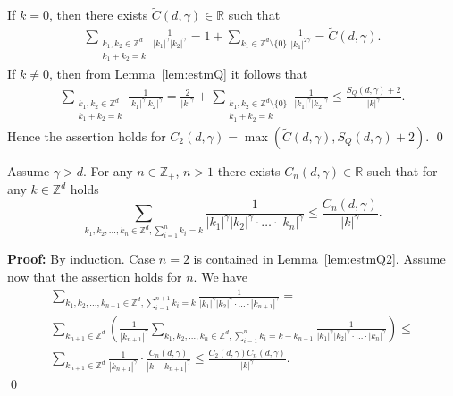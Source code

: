 If $k=0$, then there exists $\widetilde{C}(d,\gamma) \in
\mathbb{R}$ such that
\begin{eqnarray*}
  \sum_{\substack{k_1,k_2 \in \mathbb{Z}^d\\ k_1+k_2=k}} \frac{1}{|k_1|^\gamma |k_2|^\gamma} =
  1 + \sum_{k_1 \in  \mathbb{Z}^d\setminus \{0\}}
  \frac{1}{|k_1|^{2\gamma}} =\widetilde{C}(d,\gamma).
\end{eqnarray*}
If $k \neq 0$, then from Lemma~\ref{lem:estmQ} it follows that
\begin{eqnarray*}
 \sum_{\substack{k_1,k_2 \in \mathbb{Z}^d\\ k_1+k_2=k}} \frac{1}{|k_1|^\gamma
 |k_2|^\gamma}= \frac{2}{|k|^\gamma} +
 \sum_{\substack{k_1,k_2 \in \mathbb{Z}^d \setminus \{0\}\\ k_1+k_2=k}} \frac{1}{|k_1|^\gamma |k_2|^\gamma}
    \leq
    \frac{S_Q(d,\gamma) +   2}{|k|^\gamma}.
\end{eqnarray*}
Hence the assertion holds for
$C_2(d,\gamma)=\max(\widetilde{C}(d,\gamma),S_Q(d,\gamma) + 2 )$.
\qed

\begin{lemma} \cite[Lemma 3.5]{ZKS3}
\label{lem:estmQn} Assume $\gamma > d$. For any $n \in
\mathbb{Z}_+$, $n > 1$  there exists $C_n(d,\gamma) \in
\mathbb{R}$ such that for any $k \in \mathbb{Z}^d$ holds
\begin{equation*}
  \sum_{k_1,k_2,\dots,k_n \in \mathbb{Z}^d, \sum_{i=1}^n k_i=k}
  \frac{1}{|k_1|^\gamma |k_2|^\gamma \cdot \dots \cdot |k_n|^\gamma} \leq
    \frac{C_n(d,\gamma)}{|k|^{\gamma}}.
\end{equation*}
\end{lemma}
\textbf{Proof:} By induction. Case $n=2$ is contained in
Lemma~\ref{lem:estmQ2}. Assume now that the assertion holds for
$n$. We have
\begin{eqnarray*}
  \sum_{k_1,k_2,\dots,k_{n+1} \in \mathbb{Z}^d, \sum_{i=1}^{n+1} k_i=k}
  \frac{1}{|k_1|^\gamma |k_2|^\gamma \cdot \dots \cdot |k_{n+1}|^\gamma}
   = \\ \sum_{k_{n+1} \in \mathbb{Z}^d} \left( \frac{1}{|k_{n+1}|^\gamma}
    \sum_{k_1,k_2,\dots,k_n \in \mathbb{Z}^d, \sum_{i=1}^n k_i=k-k_{n+1}}
  \frac{1}{|k_1|^\gamma |k_2|^\gamma \cdot \dots \cdot |k_n|^\gamma}
  \right) \leq \\
 \sum_{k_{n+1} \in \mathbb{Z}^d}  \frac{1}{|k_{n+1}|^\gamma} \cdot
 \frac{C_n(d,\gamma)}{|k-k_{n+1}|^\gamma} \leq \frac{C_2(d,\gamma)
 C_n(d,\gamma)}{|k|^\gamma}.
\end{eqnarray*}
\qed

